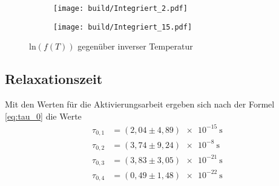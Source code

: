 \begin{figure}
  \centering
  \begin{subfigure}{0.4\textwidth}
    \centering
    \texttt{[image: build/Integriert\_2.pdf]}
  \end{subfigure}
  \begin{subfigure}{0.4\textwidth}
    \centering
    \texttt{[image: build/Integriert\_15.pdf]}
  \end{subfigure}
  \caption{$\text{ln}(f(T))$ gegenüber inverser Temperatur}
  \label{fig:Integriert}
\end{figure}

\subsection{Relaxationszeit}
Mit den Werten für die Aktivierungsarbeit ergeben sich nach der Formel \eqref{eq:tau_0} die Werte
\begin{align}
  \tau_{0,1} &= (2,04\pm 4,89)\SI{e-15}{\second}\nonumber\\
  \tau_{0,2} &= (3,74\pm 9,24)\SI{e-8}{\second}\nonumber\\
  \tau_{0,3} &= (3,83\pm 3,05)\SI{e-21}{\second}\nonumber\\
  \tau_{0,4} &= (0,49\pm 1,48)\SI{e-22}{\second}\label{eq:relax}
\end{align}